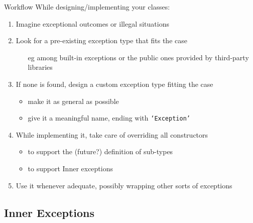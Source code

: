 \documentclass[presentation]{beamer}
\begin{document}
\begin{frame}{Workflow}
  While designing/implementing your classes:
  \vfill
  \begin{enumerate}
    \item Imagine \alert{exceptional} outcomes or \alert{illegal} situations
    
    \vfill

    \item Look for a \alert{pre-existing} exception type that fits the case
    \begin{itemize}
      \item[eg] among built-in \dotnet{} exceptions or the public ones provided by third-party libraries
    \end{itemize}

    \vfill

    \item If none is found, design a \alert{custom exception type} fitting the case
    \begin{itemize}
      \item make it as \alert{general} as possible
      \item give it a meaningful name, ending with \texttt{`Exception'}
    \end{itemize}
    
    \vfill
    
    \item While implementing it, take care of \alert{overriding} all \alert{constructors}
    \begin{itemize}
      \item to support the (future?) definition of sub-types
      \item to support Inner exceptions
    \end{itemize}
    
    \vfill

    \item Use it whenever adequate, possibly \alert{wrapping} other sorts of exceptions
  \end{enumerate}
\end{frame}

\subsection{Inner Exceptions}
\end{document}
